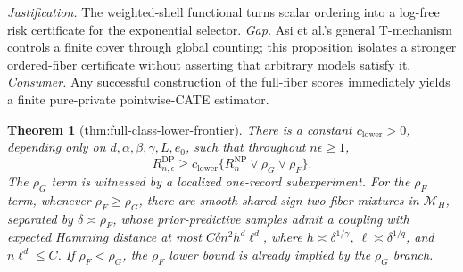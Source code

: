 \documentclass{article}
\newtheorem{theorem}{Theorem}
\begin{document}
\par\smallskip\noindent \textit{Justification.} The weighted-shell functional turns scalar ordering into a log-free risk certificate for the exponential selector. \textit{Gap.} Asi et al.'s general T-mechanism controls a finite cover through global counting; this proposition isolates a stronger ordered-fiber certificate without asserting that arbitrary models satisfy it. \textit{Consumer.} Any successful construction of the full-fiber scores immediately yields a finite pure-private pointwise-CATE estimator.

\begin{theorem}[thm:full-class-lower-frontier]\label{thm:full-class-lower-frontier}
There is a constant \(c_{\mathrm{lower}}>0\), depending only on
\(d,\alpha,\beta,\gamma,L,e_0\), such that throughout \(n\epsilon\ge1\),
\[
 R_{n,\epsilon}^{\mathrm{DP}}
 \ge c_{\mathrm{lower}}\{R_n^{\mathrm{NP}}\vee\rho_G\vee\rho_F\}.
\]
The \(\rho_G\) term is witnessed by a localized one-record subexperiment.
For the \(\rho_F\) term, whenever \(\rho_F\ge\rho_G\), there are smooth
shared-sign two-fiber mixtures in \(\mathcal M_H\), separated by
\(\delta\asymp\rho_F\), whose prior-predictive samples admit a coupling with
expected Hamming distance at most
\(C\delta n^2h^d\ell^d\), where
\(h\asymp\delta^{1/\gamma}\),
\(\ell\asymp\delta^{1/q}\), and \(n\ell^d\le C\).  If
\(\rho_F<\rho_G\), the \(\rho_F\) lower bound is already implied by the
\(\rho_G\) branch.
\end{theorem}
\end{document}
